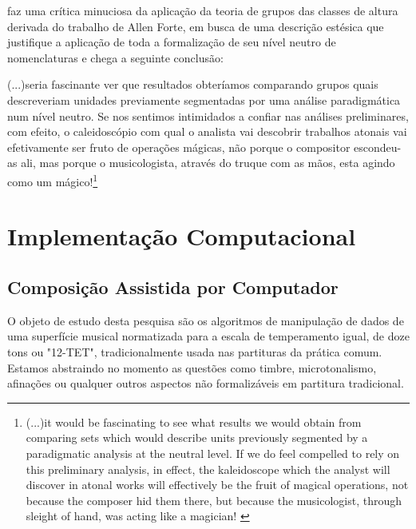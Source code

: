 \documentclass[
	12pt,				%
	openright,			%
	twoside,			%
	a4paper,			%
	english,			%
	french,				%
	spanish,			%
	brazil				%
	]{abntex2}
\begin{document}
 faz uma crítica minuciosa da aplicação da teoria de grupos das classes de altura derivada do trabalho de Allen Forte, em busca de uma descrição estésica que justifique a aplicação de toda a formalização de seu nível neutro de nomenclaturas e chega a seguinte conclusão:


\begin{citacao}
(...)seria fascinante ver que resultados obteríamos comparando grupos quais descreveriam unidades previamente segmentadas por uma análise paradigmática num nível neutro. Se nos sentimos intimidados a confiar nas análises preliminares, com efeito, o caleidoscópio com qual o analista vai descobrir trabalhos atonais vai efetivamente ser fruto de operações mágicas, não porque o compositor escondeu-as ali, mas porque o musicologista, através do truque com as mãos, esta agindo como um mágico!\cite[ p.16]{nattiez2003allen}\footnote{(...)it would be fascinating to see what results we would obtain from comparing sets which would describe units previously segmented by a paradigmatic analysis at the neutral level. If we do feel compelled to rely on this preliminary analysis, in effect, the kaleidoscope which the analyst will discover in atonal works will effectively be the fruit of magical operations, not because the composer hid them there, but because the musicologist, through sleight of hand, was acting like a magician!
\cite[ p.16]{nattiez2003allen}}
\end{citacao}






\part{Implementação Computacional}
\label{computacional}


\chapter{Composição Assistida por Computador}

O objeto de estudo desta pesquisa são os algoritmos de manipulação de dados de uma superfície musical normatizada para a escala de temperamento igual, de doze tons ou "12-TET"\cite[ p.76]{sethares2005tuning}, tradicionalmente usada nas partituras da prática comum. Estamos abstraindo no momento as questões como timbre, microtonalismo, afinações ou qualquer outros aspectos não formalizáveis em partitura tradicional. 
\end{document}
